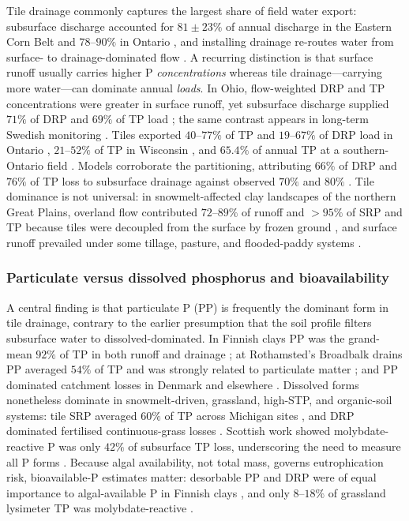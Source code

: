 Tile drainage commonly captures the largest share of field water export:
subsurface discharge accounted for $81\pm23\%$ of annual discharge in the
Eastern Corn Belt \parencite{Pease2018} and $78$--$90\%$ in Ontario
\parencite{VanEsbroeck2016}, and installing drainage re-routes water from
surface- to drainage-dominated flow \parencite{Turtola1995,BENGTSON1995}. A
recurring distinction is that surface runoff usually carries higher P
\emph{concentrations} whereas tile drainage---carrying more water---can
dominate annual \emph{loads}. In Ohio, flow-weighted DRP and TP
concentrations were greater in surface runoff, yet subsurface discharge
supplied $71\%$ of DRP and $69\%$ of TP load \parencite{Pease2018}; the same
contrast appears in long-term Swedish monitoring \parencite{Norberg2022}.
Tiles exported $40$--$77\%$ of TP and $19$--$67\%$ of DRP load in Ontario
\parencite{VanEsbroeck2016}, $21$--$52\%$ of TP in Wisconsin
\parencite{Madison2014}, and $65.4\%$ of annual TP at a southern-Ontario
field \parencite{Qi2018}. Models corroborate the partitioning, attributing
$66\%$ of DRP and $76\%$ of TP loss to subsurface drainage against observed
$70\%$ and $80\%$ \parencite{Grewal2025,Sadhukhan2019b}. Tile dominance is
not universal: in snowmelt-affected clay landscapes of the northern Great
Plains, overland flow contributed $72$--$89\%$ of runoff and $>95\%$ of SRP
and TP because tiles were decoupled from the surface by frozen ground
\parencite{Kokulan2019b,Kokulan2021}, and surface runoff prevailed under
some tillage, pasture, and flooded-paddy systems
\parencite{Zhao2001,Melland2008,DarziNaftchali2016}.

\subsubsection{Particulate versus dissolved phosphorus and bioavailability}

A central finding is that particulate P (PP) is frequently the dominant form
in tile drainage, contrary to the earlier presumption that the soil profile
filters subsurface water to dissolved-dominated. In Finnish clays PP was the
grand-mean $92\%$ of TP in both runoff and drainage \parencite{Uusitalo2001};
at Rothamsted's Broadbalk drains PP averaged $54\%$ of TP and was strongly
related to particulate matter \parencite{Lu2003,Lu2004}; and PP dominated
catchment losses in Denmark and elsewhere
\parencite{Grant1996,Brendel2019,vanderSalm2012}. Dissolved forms
nonetheless dominate in snowmelt-driven, grassland, high-STP, and
organic-soil systems: tile SRP averaged $60\%$ of TP across Michigan sites
\parencite{Clement2017}, and DRP dominated fertilised continuous-grass losses
\parencite{Zhang2015b}. Scottish work showed molybdate-reactive P was only
$42\%$ of subsurface TP loss, underscoring the need to measure all P forms
\parencite{Hooda1999}. Because algal availability, not total mass, governs
eutrophication risk, bioavailable-P estimates matter: desorbable PP and DRP
were of equal importance to algal-available P in Finnish clays
\parencite{Uusitalo2001,Uusitalo2003}, and only $8$--$18\%$ of grassland
lysimeter TP was molybdate-reactive \parencite{Bilotta2008}.


